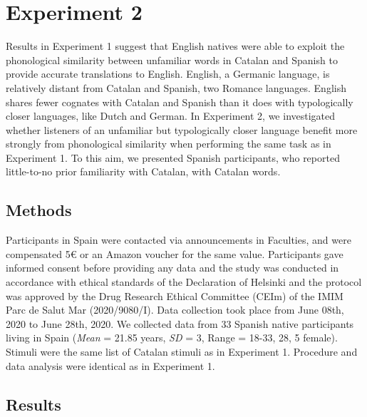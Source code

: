 \documentclass[
]{article}
\begin{document}
\section{Experiment 2}\label{experiment-2}

Results in Experiment 1 suggest that English natives were able to
exploit the phonological similarity between unfamiliar words in Catalan
and Spanish to provide accurate translations to English. English, a
Germanic language, is relatively distant from Catalan and Spanish, two
Romance languages. English shares fewer cognates with Catalan and
Spanish than it does with typologically closer languages, like Dutch and
German. In Experiment 2, we investigated whether listeners of an
unfamiliar but typologically closer language benefit more strongly from
phonological similarity when performing the same task as in Experiment
1. To this aim, we presented Spanish participants, who reported
little-to-no prior familiarity with Catalan, with Catalan words.

\subsection{Methods}\label{methods-1}

Participants in Spain were contacted via announcements in Faculties, and
were compensated 5€ or an Amazon voucher for the same value.
Participants gave informed consent before providing any data and the
study was conducted in accordance with ethical standards of the
Declaration of Helsinki and the protocol was approved by the Drug
Research Ethical Committee (CEIm) of the IMIM Parc de Salut Mar
(2020/9080/I). Data collection took place from June 08th, 2020 to June
28th, 2020. We collected data from 33 Spanish native participants living
in Spain (\emph{Mean} = 21.85 years, \emph{SD} = 3, Range = 18-33, 28, 5
female). Stimuli were the same list of Catalan stimuli as in Experiment
1. Procedure and data analysis were identical as in Experiment 1.

\subsection{Results}\label{results-1}
\end{document}
